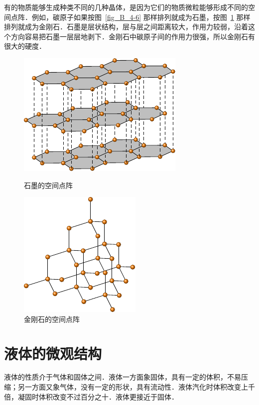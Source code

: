 有的物质能够生成种类不同的几种晶体，是因为它们的物质微粒能够形成不同的空间点阵．例如，碳原子如果按图~\ref{fig_B_4-6} 那样排列就成为石墨，按图~\ref{fig_B_4-7} 那样排列就成为金刚石．石墨是层状结构，层与层之间距离较大，作用力较弱，沿着这个方向容易把石墨一层层地剥下．金刚石中碳原子间的作用力很强，所以金刚石有很大的硬度．
\begin{figure}[htbp]
    \centering
    \begin{minipage}[t]{0.45\textwidth}
        \centering
        \includegraphics{fig/B/4-6.pdf}
        \caption{石墨的空间点阵}\label{fig_B_4-6}
    \end{minipage}
    \hfil
    \begin{minipage}[t]{0.45\textwidth}
        \centering
        \includegraphics{fig/B/4-7.pdf}
        \caption{金刚石的空间点阵}\label{fig_B_4-7}
    \end{minipage}
\end{figure}


\section{液体的微观结构}
液体的性质介于气体和固体之间．液体一方面象固体，具有一定的体积，不易压缩；另一方面又象气体，没有一定的形状，具有流动性．液体汽化时体积改变上千倍，凝固时体积改变不过百分之十．液体更接近于固体．

